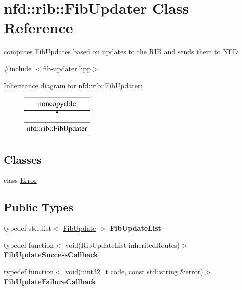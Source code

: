 \hypertarget{classnfd_1_1rib_1_1FibUpdater}{}\section{nfd\+:\+:rib\+:\+:Fib\+Updater Class Reference}
\label{classnfd_1_1rib_1_1FibUpdater}


computes Fib\+Updates based on updates to the R\+IB and sends them to N\+FD  




{\ttfamily \#include $<$fib-\/updater.\+hpp$>$}

Inheritance diagram for nfd\+:\+:rib\+:\+:Fib\+Updater\+:\begin{figure}[H]
\begin{center}
\leavevmode
\includegraphics[height=2.000000cm]{classnfd_1_1rib_1_1FibUpdater}
\end{center}
\end{figure}
\subsection*{Classes}
\begin{DoxyCompactItemize}
\item 
class \hyperlink{classnfd_1_1rib_1_1FibUpdater_1_1Error}{Error}
\end{DoxyCompactItemize}
\subsection*{Public Types}
\begin{DoxyCompactItemize}
\item 
typedef std\+::list$<$ \hyperlink{classnfd_1_1rib_1_1FibUpdate}{Fib\+Update} $>$ {\bfseries Fib\+Update\+List}\hypertarget{classnfd_1_1rib_1_1FibUpdater_a9d4a1b9228f64099a71a79766724fb1a}{}\label{classnfd_1_1rib_1_1FibUpdater_a9d4a1b9228f64099a71a79766724fb1a}

\item 
typedef function$<$ void(Rib\+Update\+List inherited\+Routes)$>$ {\bfseries Fib\+Update\+Success\+Callback}\hypertarget{classnfd_1_1rib_1_1FibUpdater_a8f17f1f8599e945032a53d4431e4c765}{}\label{classnfd_1_1rib_1_1FibUpdater_a8f17f1f8599e945032a53d4431e4c765}

\item 
typedef function$<$ void(uint32\+\_\+t code, const std\+::string \&error)$>$ {\bfseries Fib\+Update\+Failure\+Callback}\hypertarget{classnfd_1_1rib_1_1FibUpdater_ac89bd6638f826e2f913535f948c4b761}{}\label{classnfd_1_1rib_1_1FibUpdater_ac89bd6638f826e2f913535f948c4b761}

\end{DoxyCompactItemize}
